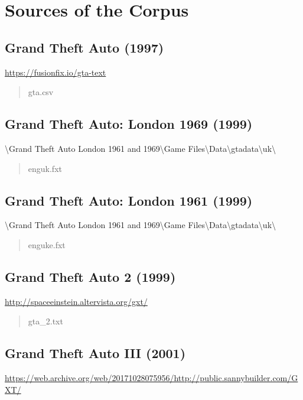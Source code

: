 \documentclass[]{scrartcl}
\begin{document}
\clearpage
\section{Sources of the Corpus}\label{sec:app_corpus}

\subsection*{Grand Theft Auto (1997)}
\url{https://fusionfix.io/gta-text}

\begin{quote}
   \ttfamily
   gta.csv
\end{quote}


\subsection*{Grand Theft Auto: London 1969 (1999)}
\textbackslash{}Grand Theft Auto London 1961 and 1969\textbackslash{}Game Files\textbackslash{}Data\textbackslash{}gtadata\textbackslash{}uk\textbackslash{}

\begin{quote}
   \ttfamily
   enguk.fxt
\end{quote}


\subsection*{Grand Theft Auto: London 1961 (1999)}
\textbackslash{}Grand Theft Auto London 1961 and 1969\textbackslash{}Game Files\textbackslash{}Data\textbackslash{}gtadata\textbackslash{}uk\textbackslash{}

\begin{quote}
   \ttfamily
   enguke.fxt
\end{quote}


\subsection*{Grand Theft Auto 2 (1999)}
\url{http://spaceeinstein.altervista.org/gxt/}

\begin{quote}
   \ttfamily
   gta\_2.txt
\end{quote}


\subsection*{Grand Theft Auto III (2001)}
\url{https://web.archive.org/web/20171028075956/http://public.sannybuilder.com/GXT/}
\end{document}
